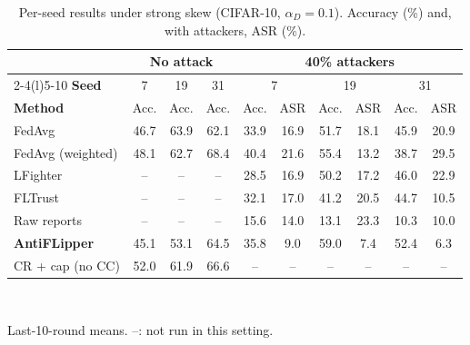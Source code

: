 \begin{table}[t]
\centering
\caption{Per-seed results under strong skew (CIFAR-10, $\alpha_D{=}0.1$). Accuracy (\%) and, with attackers, ASR (\%).}
\label{tab:seeds}
\footnotesize
\setlength{\tabcolsep}{2.6pt}
\begin{tabular}{@{}l ccc cccccc@{}}
\toprule
& \multicolumn{3}{c}{\textbf{No attack}} & \multicolumn{6}{c}{\textbf{40\% attackers}} \\
\cmidrule(lr){2-4}\cmidrule(l){5-10}
\textbf{Seed} & 7 & 19 & 31 & \multicolumn{2}{c}{7} & \multicolumn{2}{c}{19} & \multicolumn{2}{c}{31} \\
\textbf{Method} & Acc. & Acc. & Acc. & Acc. & ASR & Acc. & ASR & Acc. & ASR \\
\midrule
FedAvg & 46.7 & 63.9 & 62.1 & 33.9 & 16.9 & 51.7 & 18.1 & 45.9 & 20.9 \\
FedAvg (weighted) & 48.1 & 62.7 & 68.4 & 40.4 & 21.6 & 55.4 & 13.2 & 38.7 & 29.5 \\
LFighter & -- & -- & -- & 28.5 & 16.9 & 50.2 & 17.2 & 46.0 & 22.9 \\
FLTrust & -- & -- & -- & 32.1 & 17.0 & 41.2 & 20.5 & 44.7 & 10.5 \\
Raw reports & -- & -- & -- & 15.6 & 14.0 & 13.1 & 23.3 & 10.3 & 10.0 \\
\textbf{AntiFLipper} & 45.1 & 53.1 & 64.5 & 35.8 & 9.0 & 59.0 & 7.4 & 52.4 & 6.3 \\
CR + cap (no CC) & 52.0 & 61.9 & 66.6 & -- & -- & -- & -- & -- & -- \\
\bottomrule
\end{tabular}
\\[2pt]\parbox{\linewidth}{\scriptsize Last-10-round means. --: not run in this setting.}
\end{table}
